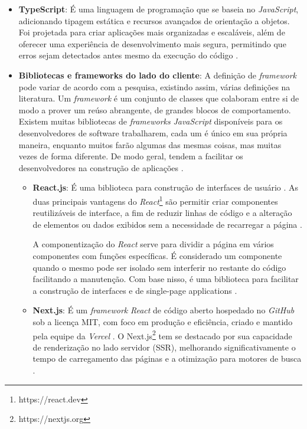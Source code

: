 \begin{itemize}
    \item \textbf{TypeScript}: É uma linguagem de programação que se baseia no \textit{JavaScript}, adicionando tipagem estática e recursos avançados de orientação a objetos. Foi projetada para criar aplicações mais organizadas e escaláveis, além de oferecer uma experiência de desenvolvimento mais segura, permitindo que erros sejam detectados antes mesmo da execução do código \cite{microsoft2025}.
    \item \textbf{Bibliotecas e frameworks do lado do cliente}: A definição de \textit{framework} pode variar de acordo com a pesquisa, existindo assim, várias definições na literatura. Um \textit{framework} é um conjunto de classes que colaboram entre si de modo a prover um reúso abrangente, de grandes blocos de comportamento. Existem muitas bibliotecas de \textit{frameworks} \textit{JavaScript} disponíveis para os desenvolvedores de software trabalharem, cada um é único em sua própria maneira, enquanto muitos farão algumas das mesmas coisas, mas muitas vezes de forma diferente. De modo geral, tendem a facilitar os desenvolvedores na construção de aplicações \cite{silva2022comparaccao}.
    \begin{itemize}
        \item \textbf{React.js}: É uma biblioteca para construção de interfaces de usuário \cite{react2025}. As duas principais vantagens do \textit{React}\footnote{https://react.dev} são permitir criar componentes reutilizáveis de interface, a fim de reduzir linhas de código e a alteração de elementos ou dados exibidos sem a necessidade de recarregar a página \cite{LorenaUFOP2021}.
        
        A componentização do \textit{React} serve para dividir a página em vários componentes com funções específicas. É considerado um componente quando o mesmo pode ser isolado sem interferir no restante do código facilitando a manutenção. Com base nisso, é uma biblioteca para facilitar a construção de interfaces e de single-page applications \cite{LorenaUFOP2021}.
        
        \item \textbf{Next.js}: É um \textit{framework} \textit{React} de código aberto hospedado no \textit{GitHub} sob a licença MIT, com foco em produção e eficiência, criado e mantido pela equipe da \textit{Vercel} \cite{nextjs2025}. O Next.js\footnote{https://nextjs.org} tem se destacado por sua capacidade de renderização no lado servidor (SSR), melhorando significativamente o tempo de carregamento das páginas e a otimização para motores de busca \cite{RenanNextjs2024}.


\end{itemize}
\end{itemize}
